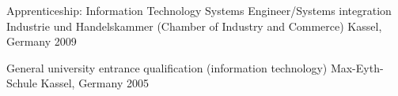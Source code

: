 

\begin{cventries}

  \cventry
    {Apprenticeship: Information Technology Systems Engineer/Systems integration} %
    {Industrie und Handelskammer (Chamber of Industry and Commerce)} %
    {Kassel, Germany} %
    {2009} %
    {}

  \cventry
    {General university entrance qualification (information technology)} %
    {Max-Eyth-Schule} %
    {Kassel, Germany} %
    {2005} %
    {}

\end{cventries}

